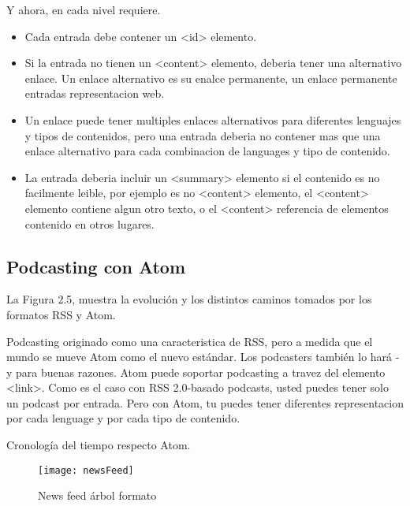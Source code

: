 Y ahora, en cada nivel requiere.

\begin{itemize}

\item Cada entrada debe contener un <id> elemento.
\item Si la entrada no tienen un <content> elemento, deberia tener una alternativo enlace. Un enlace alternativo es su enalce
permanente, un enlace permanente entradas representacion web.
\item Un enlace puede tener multiples enlaces alternativos para diferentes lenguajes y tipos de contenidos, pero una entrada
deberia no contener mas que una enlace alternativo para cada combinacion de languages y tipo de contenido.
\item La entrada deberia incluir un <summary> elemento si el contenido es no facilmente leible, por ejemplo es no <content> 
elemento, el <content> elemento contiene algun otro texto, o el <content> referencia de elementos contenido en otros lugares.\cite{johnson2006rss}

\end{itemize}

\subsection{Podcasting con Atom}

La Figura 2.5, muestra la evoluci\'{o}n y los distintos caminos tomados por los formatos 
RSS y Atom.

Podcasting originado como una caracteristica de RSS, pero a medida que el mundo se mueve Atom como el nuevo estándar.
Los podcasters también lo hará - y para buenas razones. Atom puede soportar podcasting a travez del elemento <link>.
Como es el caso con RSS 2.0-basado podcasts, usted puedes tener solo un podcast por entrada. Pero con Atom, tu puedes
tener diferentes representacion por cada lenguage y por cada tipo de contenido.\cite{johnson2006rss}

Cronolog\'{i}a del tiempo respecto Atom.

\begin{figure}[!htb]
\centering
\texttt{[image: newsFeed]}
\caption{News feed árbol formato}
\end{figure}
